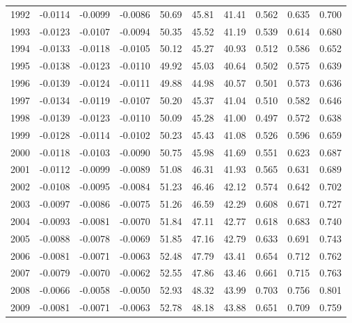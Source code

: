 \begin{tabular}{cccccccccc}
  1992 & -0.0114 & -0.0099 & -0.0086 & 50.69 & 45.81 & 41.41 & 0.562 & 0.635 & 0.700 \\ 
  1993 & -0.0123 & -0.0107 & -0.0094 & 50.35 & 45.52 & 41.19 & 0.539 & 0.614 & 0.680 \\ 
  1994 & -0.0133 & -0.0118 & -0.0105 & 50.12 & 45.27 & 40.93 & 0.512 & 0.586 & 0.652 \\ 
  1995 & -0.0138 & -0.0123 & -0.0110 & 49.92 & 45.03 & 40.64 & 0.502 & 0.575 & 0.639 \\ 
  1996 & -0.0139 & -0.0124 & -0.0111 & 49.88 & 44.98 & 40.57 & 0.501 & 0.573 & 0.636 \\ 
  1997 & -0.0134 & -0.0119 & -0.0107 & 50.20 & 45.37 & 41.04 & 0.510 & 0.582 & 0.646 \\ 
  1998 & -0.0139 & -0.0123 & -0.0110 & 50.09 & 45.28 & 41.00 & 0.497 & 0.572 & 0.638 \\ 
  1999 & -0.0128 & -0.0114 & -0.0102 & 50.23 & 45.43 & 41.08 & 0.526 & 0.596 & 0.659 \\ 
  2000 & -0.0118 & -0.0103 & -0.0090 & 50.75 & 45.98 & 41.69 & 0.551 & 0.623 & 0.687 \\ 
  2001 & -0.0112 & -0.0099 & -0.0089 & 51.08 & 46.31 & 41.93 & 0.565 & 0.631 & 0.689 \\ 
  2002 & -0.0108 & -0.0095 & -0.0084 & 51.23 & 46.46 & 42.12 & 0.574 & 0.642 & 0.702 \\ 
  2003 & -0.0097 & -0.0086 & -0.0075 & 51.26 & 46.59 & 42.29 & 0.608 & 0.671 & 0.727 \\ 
  2004 & -0.0093 & -0.0081 & -0.0070 & 51.84 & 47.11 & 42.77 & 0.618 & 0.683 & 0.740 \\ 
  2005 & -0.0088 & -0.0078 & -0.0069 & 51.85 & 47.16 & 42.79 & 0.633 & 0.691 & 0.743 \\ 
  2006 & -0.0081 & -0.0071 & -0.0063 & 52.48 & 47.79 & 43.41 & 0.654 & 0.712 & 0.762 \\ 
  2007 & -0.0079 & -0.0070 & -0.0062 & 52.55 & 47.86 & 43.46 & 0.661 & 0.715 & 0.763 \\ 
  2008 & -0.0066 & -0.0058 & -0.0050 & 52.93 & 48.32 & 43.99 & 0.703 & 0.756 & 0.801 \\ 
  2009 & -0.0081 & -0.0071 & -0.0063 & 52.78 & 48.18 & 43.88 & 0.651 & 0.709 & 0.759 \\ 
   \hline
\end{tabular}
